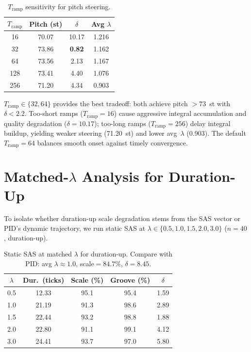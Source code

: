 \documentclass{article}
\theoremstyle{plain}
\begin{document}
\begin{table}[h]
  \caption{$T_\text{ramp}$ sensitivity for pitch steering.}
  \label{tab:tramp}
  \begin{center}
  \begin{small}
  \begin{tabular}{cccc}
    \toprule
    $T_\text{ramp}$ & Pitch (st) & $\delta$ & Avg $\lambda$ \\
    \midrule
    16 & 70.07 & 10.17 & 1.216 \\
    32 & 73.86 & \textbf{0.82} & 1.162 \\
    64 & 73.56 & 2.13 & 1.167 \\
    128 & 73.41 & 4.40 & 1.076 \\
    256 & 71.20 & 4.34 & 0.903 \\
    \bottomrule
  \end{tabular}
  \end{small}
  \end{center}
\end{table}

$T_\text{ramp} \in \{32, 64\}$ provides the best tradeoff: both achieve pitch $>73$~st with $\delta < 2.2$. Too-short ramps ($T_\text{ramp}{=}16$) cause aggressive integral accumulation and quality degradation ($\delta{=}10.17$); too-long ramps ($T_\text{ramp}{=}256$) delay integral buildup, yielding weaker steering (71.20~st) and lower avg~$\lambda$ (0.903). The default $T_\text{ramp}{=}64$ balances smooth onset against timely convergence.

\section{Matched-$\lambda$ Analysis for Duration-Up}
\label{app:matched_lambda}

To isolate whether duration-up scale degradation stems from the SAS vector or PID's dynamic trajectory, we run static SAS at $\lambda \in \{0.5, 1.0, 1.5, 2.0, 3.0\}$ ($n{=}40$, duration-up).

\begin{table}[h]
  \caption{Static SAS at matched $\lambda$ for duration-up. Compare with PID: avg $\lambda{\approx}1.0$, scale${=}84.7\%$, $\delta{=}8.45$.}
  \label{tab:matched_lambda}
  \begin{center}
  \begin{small}
  \begin{tabular}{ccccc}
    \toprule
    $\lambda$ & Dur.\ (ticks) & Scale (\%) & Groove (\%) & $\delta$ \\
    \midrule
    0.5 & 12.33 & 95.1 & 95.4 & 1.59 \\
    1.0 & 21.19 & 91.3 & 98.6 & 2.89 \\
    1.5 & 22.44 & 93.2 & 98.8 & 1.88 \\
    2.0 & 22.80 & 91.1 & 99.1 & 4.12 \\
    3.0 & 24.41 & 93.7 & 97.0 & 5.80 \\
    \bottomrule
  \end{tabular}
  \end{small}
  \end{center}
\end{table}
\end{document}

